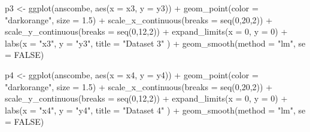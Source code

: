 \documentclass[
	12pt,				%
	oneside,			%
	a4paper,			%
	chapter=TITLE,		%
	section=TITLE,		%
	english,			%
	brazil				%
	]{abntex2}
\newenvironment{Shaded}{\begin{snugshade}}{\end{snugshade}}
\newcommand{\AttributeTok}[1]{\textcolor[rgb]{0.77,0.63,0.00}{#1}}
\newcommand{\ConstantTok}[1]{\textcolor[rgb]{0.00,0.00,0.00}{#1}}
\newcommand{\DecValTok}[1]{\textcolor[rgb]{0.00,0.00,0.81}{#1}}
\newcommand{\FloatTok}[1]{\textcolor[rgb]{0.00,0.00,0.81}{#1}}
\newcommand{\FunctionTok}[1]{\textcolor[rgb]{0.00,0.00,0.00}{#1}}
\newcommand{\NormalTok}[1]{#1}
\newcommand{\OtherTok}[1]{\textcolor[rgb]{0.56,0.35,0.01}{#1}}
\newcommand{\SpecialCharTok}[1]{\textcolor[rgb]{0.00,0.00,0.00}{#1}}
\newcommand{\StringTok}[1]{\textcolor[rgb]{0.31,0.60,0.02}{#1}}
\begin{document}
\begin{Shaded}
\begin{Highlighting}[]
\NormalTok{p3 }\OtherTok{\textless{}{-}} \FunctionTok{ggplot}\NormalTok{(anscombe, }\FunctionTok{aes}\NormalTok{(}\AttributeTok{x =}\NormalTok{ x3, }\AttributeTok{y =}\NormalTok{ y3)) }\SpecialCharTok{+}
  \FunctionTok{geom\_point}\NormalTok{(}\AttributeTok{color =} \StringTok{"darkorange"}\NormalTok{, }\AttributeTok{size =} \FloatTok{1.5}\NormalTok{) }\SpecialCharTok{+}
  \FunctionTok{scale\_x\_continuous}\NormalTok{(}\AttributeTok{breaks =} \FunctionTok{seq}\NormalTok{(}\DecValTok{0}\NormalTok{,}\DecValTok{20}\NormalTok{,}\DecValTok{2}\NormalTok{)) }\SpecialCharTok{+}
  \FunctionTok{scale\_y\_continuous}\NormalTok{(}\AttributeTok{breaks =} \FunctionTok{seq}\NormalTok{(}\DecValTok{0}\NormalTok{,}\DecValTok{12}\NormalTok{,}\DecValTok{2}\NormalTok{)) }\SpecialCharTok{+}
  \FunctionTok{expand\_limits}\NormalTok{(}\AttributeTok{x =} \DecValTok{0}\NormalTok{, }\AttributeTok{y =} \DecValTok{0}\NormalTok{) }\SpecialCharTok{+}
  \FunctionTok{labs}\NormalTok{(}\AttributeTok{x =} \StringTok{"x3"}\NormalTok{, }\AttributeTok{y =} \StringTok{"y3"}\NormalTok{,}
       \AttributeTok{title =} \StringTok{"Dataset 3"}\NormalTok{ ) }\SpecialCharTok{+}
  \FunctionTok{geom\_smooth}\NormalTok{(}\AttributeTok{method =} \StringTok{"lm"}\NormalTok{, }\AttributeTok{se =} \ConstantTok{FALSE}\NormalTok{)}

\NormalTok{p4 }\OtherTok{\textless{}{-}} \FunctionTok{ggplot}\NormalTok{(anscombe, }\FunctionTok{aes}\NormalTok{(}\AttributeTok{x =}\NormalTok{ x4, }\AttributeTok{y =}\NormalTok{ y4)) }\SpecialCharTok{+}
  \FunctionTok{geom\_point}\NormalTok{(}\AttributeTok{color =} \StringTok{"darkorange"}\NormalTok{, }\AttributeTok{size =} \FloatTok{1.5}\NormalTok{) }\SpecialCharTok{+}
  \FunctionTok{scale\_x\_continuous}\NormalTok{(}\AttributeTok{breaks =} \FunctionTok{seq}\NormalTok{(}\DecValTok{0}\NormalTok{,}\DecValTok{20}\NormalTok{,}\DecValTok{2}\NormalTok{)) }\SpecialCharTok{+}
  \FunctionTok{scale\_y\_continuous}\NormalTok{(}\AttributeTok{breaks =} \FunctionTok{seq}\NormalTok{(}\DecValTok{0}\NormalTok{,}\DecValTok{12}\NormalTok{,}\DecValTok{2}\NormalTok{)) }\SpecialCharTok{+}
  \FunctionTok{expand\_limits}\NormalTok{(}\AttributeTok{x =} \DecValTok{0}\NormalTok{, }\AttributeTok{y =} \DecValTok{0}\NormalTok{) }\SpecialCharTok{+}
  \FunctionTok{labs}\NormalTok{(}\AttributeTok{x =} \StringTok{"x4"}\NormalTok{, }\AttributeTok{y =} \StringTok{"y4"}\NormalTok{,}
       \AttributeTok{title =} \StringTok{"Dataset 4"}\NormalTok{ ) }\SpecialCharTok{+}
  \FunctionTok{geom\_smooth}\NormalTok{(}\AttributeTok{method =} \StringTok{"lm"}\NormalTok{, }\AttributeTok{se =} \ConstantTok{FALSE}\NormalTok{)}
\end{Highlighting}
\end{Shaded}
\end{document}
